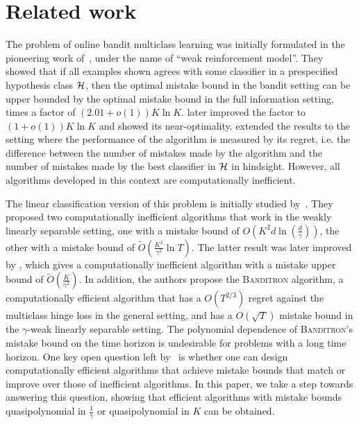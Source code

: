 \section{Related work}
\label{section:related-work}

The problem of online bandit multiclass learning was initially formulated in the
pioneering work of~\citet{Auer-Long-1999}, under the name of ``weak reinforcement
model''. They showed that if all examples shown agrees with some
classifier in a prespecified hypothesis class $\mathcal{H}$, then the optimal mistake
bound in the bandit setting can be upper bounded by the optimal mistake bound in
the full information setting, times a factor of $(2.01 + o(1))K \ln K$.
\citet{Long-2017} later improved the factor to $(1 + o(1)) K \ln K$ and showed its
 near-optimality.
\citet{Daniely-Helbertal-2013} extended the results to the setting where the
performance of the algorithm is measured by its regret, i.e. the difference
between the number of mistakes made by the algorithm and the number of mistakes
made by the best classifier in $\mathcal{H}$ in hindsight. However, all algorithms
developed in this context are computationally inefficient.

The linear classification version of this problem is initially studied
by~\citet{Kakade-Shalev-Shwartz-Tewari-2008}. They proposed two computationally
inefficient algorithms that work in the weakly linearly separable setting, one
with a mistake bound of $O(K^2 d \ln(\frac{d}{\gamma}))$, the other with a
mistake bound of $\widetilde{O}(\frac{K^2}{\gamma^2} \ln T)$.
The latter result was later improved by \citet{Daniely-Helbertal-2013},
which gives a computationally inefficient algorithm with a mistake
upper bound of $\widetilde{O}(\frac{K}{\gamma^2})$.
In addition, the
authors propose the \textsc{Banditron} algorithm, a computationally efficient
algorithm that has a $O(T^{2/3})$ regret against the multiclass hinge loss in
the general setting, and has a $O(\sqrt{T})$ mistake bound in the $\gamma$-weak
linearly separable setting. The polynomial dependence of \textsc{Banditron}'s
mistake bound on the time horizon is undesirable for problems with a long time
horizon. One key open question left by~\citet{Kakade-Shalev-Shwartz-Tewari-2008}
is whether one can design computationally efficient algorithms that achieve
mistake bounds that match or improve over those of inefficient algorithms. In
this paper, we take a step towards answering this question, showing that
efficient algorithms with mistake bounds quasipolynomial in $\frac 1 \gamma$
or quasipolynomial in $K$ can be obtained.

